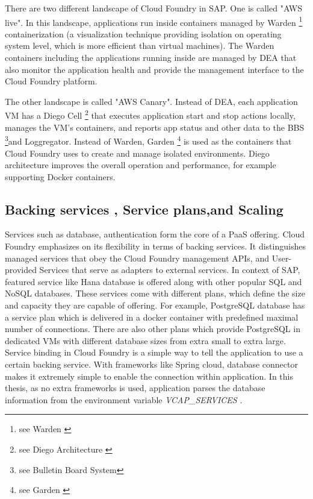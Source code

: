 There are two different landscape of Cloud Foundry in SAP. One is called "AWS live". In this landscape, applications run inside containers managed by Warden  \footnote{see Warden \citep{Warden} } containerization (a visualization technique providing isolation on operating system level, which is more efficient than virtual machines). The Warden containers including the applications running inside are managed by \ac{DEA} that also monitor the application health and provide the management interface to the Cloud Foundry platform.

The other landscape is called "AWS Canary". Instead of \ac{DEA}, each application VM has a Diego Cell  \footnote{see Diego Architecture \citep{Diego}} that executes application start and stop actions locally, manages the VM’s containers, and reports app status and other data to the \ac{BBS} \footnote{see Bulletin Board System\citep{BBS} }and Loggregator. Instead of Warden, Garden \footnote{see Garden \citep{Garden}} is used as the containers that Cloud Foundry uses to create and manage isolated environments. Diego architecture improves the overall operation and performance, for example supporting Docker containers.

\subsection{ Backing services , Service plans,and Scaling}
Services such as database, authentication form the core of a \ac{PaaS} offering. Cloud Foundry emphasizes on its flexibility in terms of backing services. It distinguishes managed services that obey the Cloud Foundry management APIs, and User-provided Services that serve as adapters to external services. In context of SAP, featured service like Hana database is offered along with other popular SQL and NoSQL databases. These services come with different plans, which define the size and capacity they are capable of offering. For example, PostgreSQL database has a service plan which is delivered in a docker container with predefined maximal number of connections. There are also other plans which provide PostgreSQL in dedicated VMs with different database sizes from extra small to extra large. \\
Service binding in Cloud Foundry is a simple way to tell the application to use a certain backing service. With frameworks like Spring cloud, database connector makes it extremely simple to enable the connection within application. In this thesis, as no extra frameworks is used, application parses the database information from the environment variable \textit{VCAP\_SERVICES} . \\

